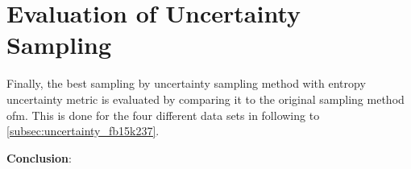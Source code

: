 \section{Evaluation of Uncertainty Sampling}
\label{ch:evaluation:sec:evaluation_uncertainty}

Finally, the best sampling by uncertainty sampling method \ussoftmax with entropy uncertainty metric is evaluated by comparing it to the original sampling method ofm\kbgan.
This is done for the four different data sets in following  to \ref{subsec:uncertainty_fb15k237}.










\textbf{Conclusion}:\\